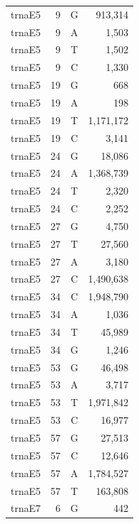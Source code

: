 \documentclass[12pt]{rockefeller}
\begin{document}
{\begin{center}
\begin{supertabular}{|l|r|c|r|}
  trnaE5 &         9 &          G &    913,314 \\
  trnaE5 &         9 &          A &      1,503 \\
  trnaE5 &         9 &          T &      1,502 \\
  trnaE5 &         9 &          C &      1,330 \\
  trnaE5 &        19 &          G &        668 \\
  trnaE5 &        19 &          A &        198 \\
  trnaE5 &        19 &          T &  1,171,172 \\
  trnaE5 &        19 &          C &      3,141 \\
  trnaE5 &        24 &          G &     18,086 \\
  trnaE5 &        24 &          A &  1,368,739 \\
  trnaE5 &        24 &          T &      2,320 \\
  trnaE5 &        24 &          C &      2,252 \\
  trnaE5 &        27 &          G &      4,750 \\
  trnaE5 &        27 &          T &     27,560 \\
  trnaE5 &        27 &          A &      3,180 \\
  trnaE5 &        27 &          C &  1,490,638 \\
  trnaE5 &        34 &          C &  1,948,790 \\
  trnaE5 &        34 &          A &      1,036 \\
  trnaE5 &        34 &          T &     45,989 \\
  trnaE5 &        34 &          G &      1,246 \\
  trnaE5 &        53 &          G &     46,498 \\
  trnaE5 &        53 &          A &      3,717 \\
  trnaE5 &        53 &          T &  1,971,842 \\
  trnaE5 &        53 &          C &     16,977 \\
  trnaE5 &        57 &          G &     27,513 \\
  trnaE5 &        57 &          C &     12,646 \\
  trnaE5 &        57 &          A &  1,784,527 \\
  trnaE5 &        57 &          T &    163,808 \\
  trnaE7 &         6 &          G &        442 \\

\end{supertabular}
\end{center}}
\end{document}
